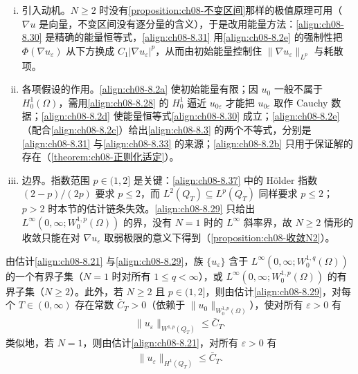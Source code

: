 \documentclass[../../main.tex]{subfiles}%
\begin{document}
\begin{remark}\label{remark:ch08-先验估计N2动机}
\begin{enumerate}[(i)]
\item 引入动机。$N\geqslant2$ 时没有\cref{proposition:ch08-不变区间}那样的极值原理可用（$\nabla u$ 是向量，不变区间没有逐分量的含义），于是改用能量方法：\eqref{align:ch08-8.30} 是精确的能量恒等式，\eqref{align:ch08-8.31} 用\eqref{align:ch08-8.2e} 的强制性把 $\Phi(\nabla u_\varepsilon)$ 从下方换成 $C_1|\nabla u_\varepsilon|^p$，从而由初始能量控制住 $\|\nabla u_\varepsilon\|_{L^p}$ 与耗散项。
\item 各项假设的作用。\eqref{align:ch08-8.2a} 使初始能量有限；因 $u_0$ 一般不属于 $H^1_0(\Omega)$，需用\eqref{align:ch08-8.28} 的 $H^1_0$ 逼近 $u_{0\varepsilon}$ 才能把 $u_{0\varepsilon}$ 取作 Cauchy 数据；\eqref{align:ch08-8.2d} 使能量恒等式\eqref{align:ch08-8.30} 成立；\eqref{align:ch08-8.2e}（配合\eqref{align:ch08-8.2c}）给出\eqref{align:ch08-8.3} 的两个不等式，分别是\eqref{align:ch08-8.31} 与\eqref{align:ch08-8.33} 的来源；\eqref{align:ch08-8.2b} 只用于保证解的存在（\cref{theorem:ch08-正则化适定}）。
\item 边界。指数范围 $p\in(1,2]$ 是关键：\eqref{align:ch08-8.37} 中的 Hölder 指数 $(2-p)/(2p)$ 要求 $p\leqslant2$，而 $L^2(Q_T)\subseteq L^p(Q_T)$ 同样要求 $p\leqslant2$；$p>2$ 时本节的估计链条失效。\eqref{align:ch08-8.29} 只给出 $L^\infty(0,\infty;W^{1,p}_0(\Omega))$ 的界，没有 $N=1$ 时的 $L^\infty$ 斜率界，故 $N\geqslant2$ 情形的收敛只能在对 $\nabla u_\varepsilon$ 取弱极限的意义下得到（\cref{proposition:ch08-收敛N2}）。
\end{enumerate}
\end{remark}

\begin{remark}\label{remark:ch08-W1p界}
由估计\eqref{align:ch08-8.21} 与\eqref{align:ch08-8.29}，族 $\{u_\varepsilon\}$ 含于 $L^\infty(0,\infty;W^{1,q}_0(\Omega))$ 的一个有界子集（$N=1$ 时对所有 $1\leqslant q<\infty$），或 $L^\infty(0,\infty;W^{1,p}_0(\Omega))$ 的有界子集（$N\geqslant2$）。此外，若 $N\geqslant2$ 且 $p\in(1,2]$，则由估计\eqref{align:ch08-8.29}，对每个 $T\in(0,\infty)$ 存在常数 $\bar C_T>0$（依赖于 $\|u_0\|_{W^{1,p}_0(\Omega)}$），使对所有 $\varepsilon>0$ 有
\begin{align}
\|u_\varepsilon\|_{W^{1,p}(Q_T)}\leqslant\bar C_T. \label{align:ch08-8.34}
\end{align}
类似地，若 $N=1$，则由估计\eqref{align:ch08-8.21}，对所有 $\varepsilon>0$ 有
\begin{align}
\|u_\varepsilon\|_{H^1(Q_T)}\leqslant\bar C_T. \label{align:ch08-8.35}
\end{align}
\end{remark}
\end{document}

